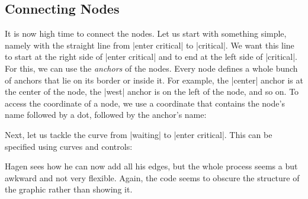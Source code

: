 \subsection{Connecting Nodes}

It is now high time to connect the nodes. Let us start with something simple,
namely with the straight line from |enter critical| to |critical|. We want this
line to start at the right side of |enter critical| and to end at the left side
of |critical|. For this, we can use the \emph{anchors} of the nodes. Every node
defines a whole bunch of anchors that lie on its border or inside it. For
example, the |center| anchor is at the center of the node, the |west| anchor is
on the left of the node, and so on. To access the coordinate of a node, we use
a coordinate that contains the node's name followed by a dot, followed by the
anchor's name:
%
\begin{codeexample}[preamble={\usetikzlibrary{positioning}}]
\end{codeexample}

Next, let us tackle the curve from |waiting| to |enter critical|. This can be
specified using curves and controls:
%
\begin{codeexample}[preamble={\usetikzlibrary{positioning}}]
\end{codeexample}

Hagen sees how he can now add all his edges, but the whole process seems a but
awkward and not very flexible. Again, the code seems to obscure the structure
of the graphic rather than showing it.


